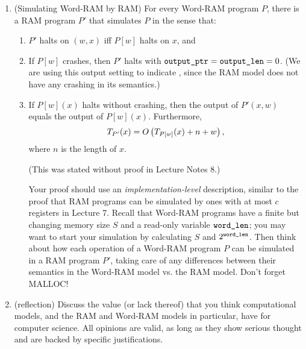 \documentclass[11pt]{article}
\begin{document}
\begin{enumerate}
\begin{enumerate}
    \item (optional\footnote{This problem won't make a difference between N, L, R-, and R grades.}) Give a theoretical explanation of the shapes of the runtime curves you see in Part~\ref{itm:realtime}, by providing explicit formulas for the asymptotic runtimes of the two programs (in clock time). You may need to do some research online and/or make guesses about how Python operations are implemented to come up with your estimates. 

\end{enumerate}

\item (Simulating Word-RAM by RAM) For every Word-RAM program $P$, there is a RAM program $P'$ that simulates $P$ in the sense that:
\begin{enumerate}
    \item $P'$ halts on $(w,x)$ iff $P[w]$ halts on $x$, and 
    \item If $P[w]$ crashes, then $P'$ halts with $\texttt{output\_ptr}=\texttt{output\_len}=0$. (We are using this output setting to indicate \crash, since the RAM model does not have any crashing in its semantics.)
    \item If $P[w](x)$ halts without crashing, then the output of $P'(x,w)$ equals the output of $P[w](x)$.
     Furthermore,   
       $$T_{P'}(x) = O\left(T_{P[w]}(x)+n+w\right),$$
where $n$ is the length of $x$.

(This was stated without proof in Lecture Notes 8.) 

Your proof should use an {\em implementation-level} description, similar to the proof that RAM programs can be simulated by ones with at most $c$ registers in Lecture 7.  Recall that Word-RAM programs have a finite but changing memory size $S$ and a read-only variable $\texttt{word\_len}$; you may want to start your simulation by calculating $S$ and $2^{\texttt{word\_len}}$.  Then think about how each operation of a Word-RAM program $P$ can be simulated in a RAM program $P'$, taking care of any differences between their semantics in the Word-RAM model vs. the RAM model. Don't forget MALLOC!

\end{enumerate}

\item (reflection) Discuss the value (or lack thereof) that you think computational models, and the RAM and Word-RAM models in particular, have for computer science.  All opinions are valid, as long as they show serious thought and are backed by specific justifications.
\end{enumerate}
\end{document}
